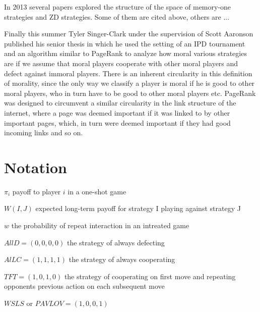 In 2013 several papers explored the structure of the space of memory-one strategies and ZD strategies. Some of them are cited above, others are ...

Finally this summer Tyler Singer-Clark under the supervision of Scott Aaronson published his senior thesis in which he used the setting of an IPD tournament and an algorithm similar to PageRank to analyze how moral various strategies are if we assume that moral players cooperate with other moral players and defect against immoral players. There is an inherent circularity in this definition of morality, since the only way we classify a player is moral if he is good to other moral players, who in turn have to be good to other moral players etc. PageRank was designed to circumvent a similar circularity in the link structure of the internet, where a page was deemed important if it was linked to by other important pages, which, in turn were deemed important if they had good incoming links and so on.



\section{Notation}
$\pi_i$ payoff to player $i$ in a one-shot game

$W(I, J)$ expected long-term payoff for strategy I playing against strategy J

$w$ the probability of repeat interaction in an intreated game

$AllD = (0, 0, 0, 0)$ the strategy of always defecting

$AlLC = (1, 1, 1, 1)$ the strategy of always cooperating

$TFT = (1, 0, 1, 0)$ the strategy of cooperating on first move and repeating opponents previous action on each subsequent move

$WSLS$ or $PAVLOV = (1,0,0,1)$